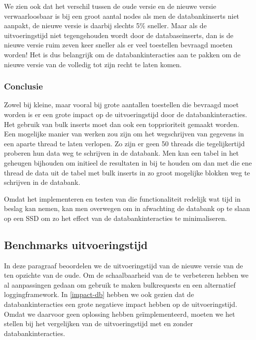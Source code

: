 We zien ook dat het verschil tussen de oude versie en de nieuwe versie verwaarloosbaar is bij een groot aantal nodes als men de databankinserts niet aanpakt,
de nieuwe versie is daarbij slechts 5\% sneller.
Maar als de uitvoeringstijd niet tegengehouden wordt door de databaseinserts,
dan is de nieuwe versie ruim zeven keer sneller als er veel toestellen bevraagd moeten worden!
Het is dus belangrijk om de databankinteracties aan te pakken om de nieuwe versie van de \nwmretriever{} volledig tot zijn recht te laten komen.

\subsubsection{Conclusie}

Zowel bij kleine, maar vooral bij grote aantallen toestellen die bevraagd moet worden is er een grote impact op de uitvoeringstijd door de databankinteracties.
Het gebruik van bulk inserts moet dan ook een topprioriteit gemaakt worden.
Een mogelijke manier van werken zou zijn om het wegschrijven van gegevens in een aparte thread te laten verlopen.
Zo zijn er geen 50 threads die tegelijkertijd proberen hun data weg te schrijven in de databank.
Men kan een tabel in het geheugen bijhouden om initieel de resultaten in bij te houden om dan met die ene thread
de data uit de tabel met bulk inserts in zo groot mogelijke blokken weg te schrijven in de databank.

Omdat het implementeren en testen van die functionaliteit redelijk wat tijd in beslag kan nemen,
kan men overwegen om in afwachting de databank op te slaan op een SSD om zo het effect van de databankinteracties te minimaliseren.


\subsection{Benchmarks uitvoeringstijd}
\label{uitvoeringstijd-vwall}


In deze paragraaf beoordelen we de uitvoeringstijd van de nieuwe versie van de \nwmretriever{} ten opzichte van de oude.
Om de schaalbaarheid van de \nwmretriever{} te verbeteren hebben we al aanpassingen gedaan om gebruik te maken bulkrequests en een alternatief loggingframework.
In \cref{impact-db} hebben we ook gezien dat de databankinteracties een grote negatieve impact hebben op de uitvoeringstijd.
Omdat we daarvoor geen oplossing hebben geïmplementeerd, moeten we het stellen bij het vergelijken van de uitvoeringstijd met en zonder databankinteracties.

